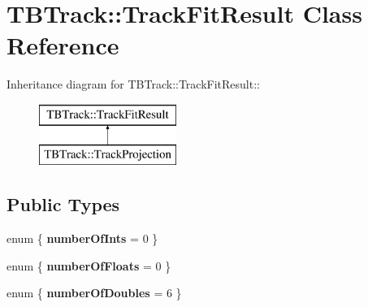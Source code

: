 \section{TBTrack::TrackFitResult Class Reference}
\label{classTBTrack_1_1TrackFitResult}
Inheritance diagram for TBTrack::TrackFitResult::\begin{figure}[H]
\begin{center}
\leavevmode
\includegraphics[height=2cm]{classTBTrack_1_1TrackFitResult}
\end{center}
\end{figure}
\subsection*{Public Types}
\begin{DoxyCompactItemize}
\item 
enum \{ {\bfseries numberOfInts} = 0
 \}
\item 
enum \{ {\bfseries numberOfFloats} = 0
 \}
\item 
enum \{ {\bfseries numberOfDoubles} = 6
 \}
\end{DoxyCompactItemize}
